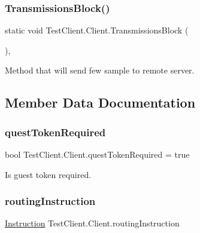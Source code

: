 \subsubsection{\texorpdfstring{Transmissions\+Block()}{TransmissionsBlock()}}
{\footnotesize\ttfamily static void Test\+Client.\+Client.\+Transmissions\+Block (\begin{DoxyParamCaption}{ }\end{DoxyParamCaption})\hspace{0.3cm}{\ttfamily [static]}, {\ttfamily [private]}}



Method that will send few sample to remote server. 



\subsection{Member Data Documentation}
\mbox{\label{class_test_client_1_1_client_a1c9bf7696f11d779b1cea41f919fd3c5}} 
\subsubsection{\texorpdfstring{quest\+Token\+Required}{questTokenRequired}}
{\footnotesize\ttfamily bool Test\+Client.\+Client.\+quest\+Token\+Required = true\hspace{0.3cm}{\ttfamily [static]}}



Is guest token required. 

\mbox{\label{class_test_client_1_1_client_ac5365a862c09065db31123126239a7ee}} 
\subsubsection{\texorpdfstring{routing\+Instruction}{routingInstruction}}
{\footnotesize\ttfamily \mbox{\hyperlink{class_pipes_provider_1_1_networking_1_1_routing_1_1_instruction}{Instruction}} Test\+Client.\+Client.\+routing\+Instruction\hspace{0.3cm}{\ttfamily [static]}}



